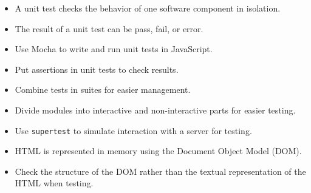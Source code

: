 \begin{itemize}
\item
  A unit test checks the behavior of one software component in isolation.
\item
  The result of a unit test can be pass, fail, or error.
\item
  Use Mocha to write and run unit tests in JavaScript.
\item
  Put assertions in unit tests to check results.
\item
  Combine tests in suites for easier management.
\item
  Divide modules into interactive and non-interactive parts for easier testing.
\item
  Use \texttt{supertest} to simulate interaction with a server for testing.
\item
  HTML is represented in memory using the Document Object Model (DOM).
\item
  Check the structure of the DOM rather than the textual representation of the HTML when testing.
\end{itemize}
